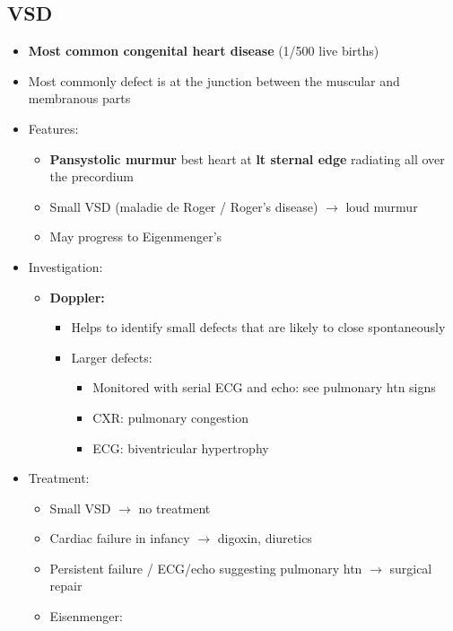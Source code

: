 \documentclass[
  12pt,
]{memoir}
\providecommand{\tightlist}{%
  \setlength{\itemsep}{0pt}\setlength{\parskip}{0pt}}
\begin{document}
\hypertarget{vsd}{%
\subsection{VSD}\label{vsd}}

\begin{itemize}
\tightlist
\item
  \textbf{Most common congenital heart disease} (1/500 live births)
\item
  Most commonly defect is at the junction between the muscular and
  membranous parts
\item
  Features:

  \begin{itemize}
  \tightlist
  \item
    \textbf{Pansystolic murmur} best heart at \textbf{lt sternal edge}
    radiating all over the precordium
  \item
    Small VSD (maladie de Roger / Roger's disease) \(\rightarrow\) loud
    murmur
  \item
    May progress to Eigenmenger's
  \end{itemize}
\item
  Investigation:

  \begin{itemize}
  \tightlist
  \item
    \textbf{Doppler:}

    \begin{itemize}
    \tightlist
    \item
      Helps to identify small defects that are likely to close
      spontaneously
    \item
      Larger defects:

      \begin{itemize}
      \tightlist
      \item
        Monitored with serial ECG and echo: see pulmonary htn signs
      \item
        CXR: pulmonary congestion
      \item
        ECG: biventricular hypertrophy
      \end{itemize}
    \end{itemize}
  \end{itemize}
\item
  Treatment:

  \begin{itemize}
  \tightlist
  \item
    Small VSD \(\rightarrow\) no treatment
  \item
    Cardiac failure in infancy \(\rightarrow\) digoxin, diuretics
  \item
    Persistent failure / ECG/echo suggesting pulmonary htn
    \(\rightarrow\) surgical repair
  \item
    Eisenmenger:


\end{itemize}
\end{itemize}
\end{document}
